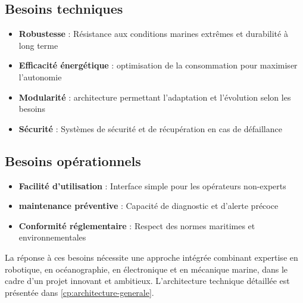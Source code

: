 {\subsection{Besoins techniques}
\begin{itemize}
    \item \textbf{Robustesse} : Résistance aux conditions marines extrêmes et durabilité à long terme
    \item \textbf{Efficacité énergétique} : \gls{optimisation} de la consommation pour maximiser l'autonomie
    \item \textbf{Modularité} : \gls{architecture} permettant l'adaptation et l'évolution selon les besoins
    \item \textbf{Sécurité} : Systèmes de sécurité et de récupération en cas de défaillance
\end{itemize}

\subsection{Besoins opérationnels}
\begin{itemize}
    \item \textbf{Facilité d'utilisation} : Interface simple pour les opérateurs non-experts
    \item \textbf{\gls{maintenance} préventive} : Capacité de diagnostic et d'alerte précoce
    \item \textbf{Conformité réglementaire} : Respect des normes maritimes et environnementales
\end{itemize}

La réponse à ces besoins nécessite une approche intégrée combinant expertise en robotique, en océanographie, en électronique et en mécanique marine, dans le cadre d'un projet innovant et ambitieux. L'\gls{architecture} technique détaillée est présentée dans \autoref{cp:architecture-generale}.

} 